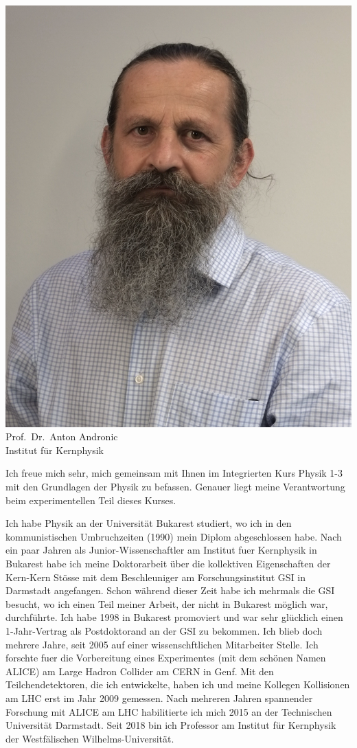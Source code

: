 \begin{multicols}{2}
\begin{center}
\includegraphics[width=0.8\columnwidth]{res/vorstellungsfotos/andronic.png}\\
\smallskip
Prof.\ Dr.\ Anton Andronic\\
Institut für Kernphysik
\end{center}

Ich freue mich sehr, mich gemeinsam mit Ihnen im Integrierten Kurs Physik 1-3 mit den Grundlagen der Physik zu befassen. Genauer liegt meine Verantwortung beim experimentellen Teil dieses Kurses.

Ich habe Physik an der Universität Bukarest studiert, wo ich in den kommunistischen Umbruchzeiten (1990) mein Diplom abgeschlossen habe. Nach ein paar Jahren als Junior-Wissenschaftler am Institut fuer Kernphysik in Bukarest habe ich meine Doktorarbeit über die kollektiven Eigenschaften der Kern-Kern Stösse mit dem Beschleuniger am Forschungsinstitut GSI in Darmstadt angefangen. Schon
während dieser Zeit habe ich mehrmals die GSI besucht, wo ich einen Teil meiner Arbeit, der nicht in Bukarest möglich war, durchführte. Ich habe 1998 in Bukarest promoviert und war sehr glücklich einen 1-Jahr-Vertrag als Postdoktorand an der GSI zu bekommen. Ich blieb doch mehrere Jahre, seit 2005 auf einer wissenschftlichen Mitarbeiter Stelle. Ich forschte fuer die Vorbereitung eines Experimentes (mit dem schönen Namen ALICE) am Large Hadron Collider am CERN in Genf. Mit den Teilchendetektoren, die ich entwickelte, haben ich und meine Kollegen Kollisionen am LHC erst im Jahr 2009 gemessen. Nach mehreren Jahren spannender Forschung mit ALICE am LHC habilitierte ich mich 2015 an der Technischen Universität Darmstadt. Seit 2018 bin ich Professor am Institut für Kernphysik der Westfälischen Wilhelms-Universität.


\end{multicols}
